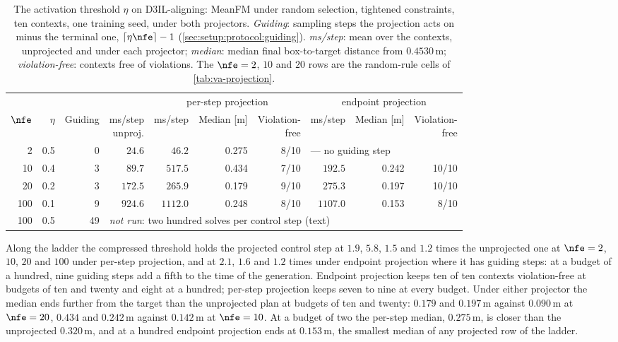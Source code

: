 \begin{table}[htpb]
  \caption[Alignment: the activation threshold across the budget ladder]{The activation threshold
  $\eta$ on D3IL-aligning: MeanFM under random selection, tightened constraints, ten contexts, one
  training seed, under both projectors. \emph{Guiding}: sampling steps the projection acts on minus the
  terminal one, $\lceil \eta\nfe \rceil - 1$ (\autoref{sec:setup:protocol:guiding}). \emph{ms/step}:
  mean over the contexts, unprojected and under each projector;
  \emph{median}: median final box-to-target distance from $0.4530$\,m; \emph{violation-free}: contexts free of
  violations. The $\nfe=2$, $10$ and $20$ rows are the random-rule cells of \autoref{tab:va-projection}.}
  \label{tab:va-threshold}
  \centering
  \footnotesize
  \setlength{\tabcolsep}{3pt}
  \begin{tabularx}{\linewidth}{@{}r r r r rrr rrr@{}}
    \toprule
    & & & & \multicolumn{3}{c}{per-step projection} & \multicolumn{3}{c}{endpoint projection} \\
    \cmidrule(lr){5-7}\cmidrule(l){8-10}
    $\nfe$ & $\eta$ & Guiding & \shortstack{ms/step\\unproj.} & ms/step & Median [m] & \shortstack{Violation-\\free} & ms/step & Median [m] & \shortstack{Violation-\\free} \\
    \midrule
    2   & 0.5 & 0  & $24.6$  & $46.2$  & 0.275 & 8/10  & \multicolumn{3}{l}{--- no guiding step} \\
    10  & 0.4 & 3  & $89.7$  & $517.5$ & 0.434 & 7/10  & $192.5$ & 0.242 & 10/10 \\
    20  & 0.2 & 3  & $172.5$ & $265.9$ & 0.179 & 9/10  & $275.3$ & 0.197 & 10/10 \\
    100 & 0.1 & 9  & $924.6$ & $1112.0$ & 0.248 & 8/10 & $1107.0$ & 0.153 & 8/10 \\
    100 & 0.5 & 49 & \multicolumn{7}{l}{\emph{not run}: two hundred solves per control step (text)} \\
    \bottomrule
  \end{tabularx}
\end{table}

Along the ladder the compressed threshold holds the projected control step at $1.9$, $5.8$, $1.5$ and
$1.2$ times the unprojected one at $\nfe=2$, $10$, $20$ and $100$ under per-step projection, and at $2.1$,
$1.6$ and $1.2$ times under endpoint projection where it has guiding steps: at a budget of a hundred,
nine guiding steps add a fifth to the time of the generation. Endpoint projection keeps ten of ten contexts
violation-free at budgets of ten and twenty and eight at a hundred; per-step projection keeps seven to nine at
every budget. Under either projector the median ends further from the target than the unprojected plan at
budgets of ten and twenty: $0.179$ and $0.197$\,m against $0.090$\,m at $\nfe=20$, $0.434$ and $0.242$\,m
against $0.142$\,m at $\nfe=10$. At a budget of two the per-step median, $0.275$\,m, is closer than the
unprojected $0.320$\,m, and at a hundred endpoint projection ends at $0.153$\,m, the smallest median of any
projected row of the ladder.

